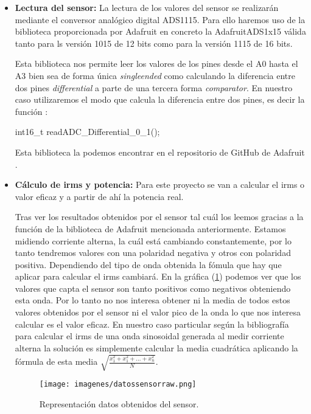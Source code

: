 \begin{itemize}
\item\textbf{Lectura del sensor:}  La lectura de los valores del sensor se realizarán mediante el conversor analógico digital ADS1115. Para ello haremos uso de la biblioteca proporcionada por Adafruit en concreto la Adafruit\textunderscore ADS1x15 \cite{adafruitbib} válida tanto para ls versión 1015 de 12 bits como para la versión 1115 de 16 bits.

Esta biblioteca nos permite leer los valores de los pines desde el A0 hasta el A3 bien sea de forma única \textit{singleended} como calculando la diferencia entre dos pines \textit{differential} a parte de una tercera forma \textit{comparator}. En nuestro caso utilizaremos el modo que calcula la diferencia entre dos pines, es decir la función :

\begin{listing}[style=consola, numbers=none]
	int16_t readADC_Differential_0_1();
\end{listing} 

Esta biblioteca la podemos encontrar en el repositorio de GitHub de Adafruit \cite{adafruitbib}.

\item\textbf{Cálculo de irms y potencia:} Para este proyecto se van a calcular el irms o valor eficaz \cite{valoreficaz} y a partir de ahí la potencia real.

Tras ver los resultados obtenidos por el sensor tal cuál los leemos gracias a la función de la biblioteca de Adafruit mencionada anteriormente. Estamos midiendo corriente alterna, la cuál está cambiando constantemente, por lo tanto tendremos valores con una polaridad negativa y otros con polaridad positiva. Dependiendo del tipo de onda obtenida la fómula que hay que aplicar para calcular el irms cambiará. En la gráfica (\ref{fig:graficasensorraw}) podemos ver que los valores que capta el sensor son tanto positivos como negativos obteniendo esta onda. Por lo tanto no nos interesa obtener ni la media de todos estos valores obtenidos por el sensor ni el valor pico de la onda lo que nos interesa calcular es el valor eficaz. En nuestro caso particular según la bibliografía \cite{mediacuadraticawiki} para calcular el irms de una onda sinosoidal generada al medir corriente alterna la solución es simplemente calcular la media cuadrática aplicando la fórmula de esta media \cite{mediacuadraticawiki} $ \sqrt{\frac{x^2_{1} + x^2_{1} + ... + x^2_{n}}{N}}$.


\begin{figure}[H]
	\centering
	\texttt{[image: imagenes/datossensorraw.png]}
	\caption{Representación datos obtenidos del sensor.}
	\label{fig:graficasensorraw}
\end{figure}


\end{itemize}
